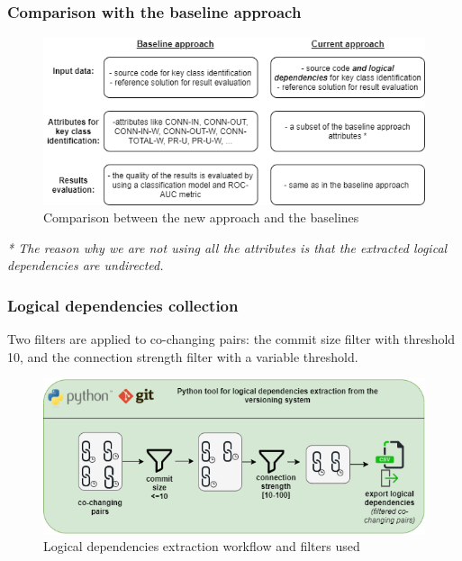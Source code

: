 \documentclass{beamer}
\begin{document}
 \begin{frame}
\frametitle{Comparison with the baseline approach}
 \begin{center}
     \begin{figure}
	\includegraphics[width=\textwidth]{baseline_comparison.png}
	\caption{\label{fig:fig}Comparison between the new approach and the baselines}
     \end{figure}
\end{center}

\textit{* The reason why we are not using all the attributes is that the extracted logical dependencies are undirected.}
\end{frame}


 \begin{frame}
\frametitle{Logical dependencies collection}
Two filters are applied to co-changing pairs: the commit size filter with threshold 10, and the connection strength filter with a variable threshold. 
 \begin{center}
     \begin{figure}
	\includegraphics[width=\textwidth]{ld_collection.png}
	\caption{\label{fig:fig}Logical dependencies extraction workflow and filters used}
     \end{figure}
\end{center}
\end{frame}
\end{document}
